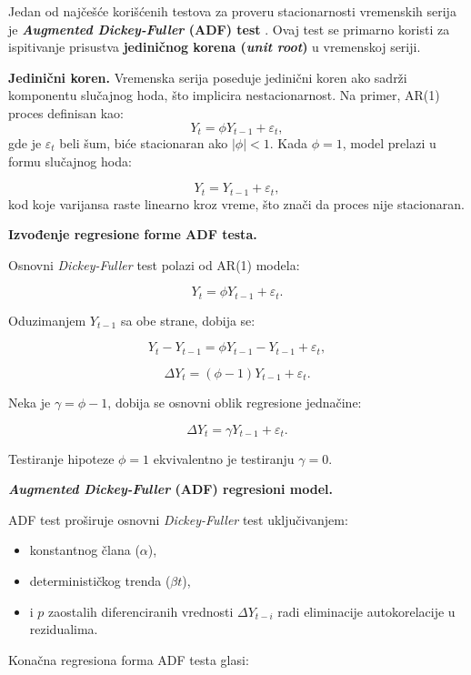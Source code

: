 \documentclass[12pt]{article}
\begin{document}
\noindent Jedan od najčešće korišćenih testova za proveru stacionarnosti vremenskih serija je \textbf{\textit{Augmented Dickey-Fuller} (ADF) test} \cite{dickey1979, box1970}. Ovaj test se primarno koristi za ispitivanje prisustva \textbf{jediničnog korena (\textit{unit root})} u vremenskoj seriji.

\bigskip

\noindent \textbf{Jedinični koren.} Vremenska serija poseduje jedinični koren ako sadrži komponentu slučajnog hoda, što implicira nestacionarnost. Na primer, AR(1) proces definisan kao:
\[
Y_t = \phi Y_{t-1} + \varepsilon_t,
\]
gde je $\varepsilon_t$ beli šum, biće stacionaran ako $|\phi| < 1$. Kada $\phi = 1$, model prelazi u formu slučajnog hoda:

\[
Y_t = Y_{t-1} + \varepsilon_t,
\]
kod koje varijansa raste linearno kroz vreme, što znači da proces nije stacionaran.


\noindent \textbf{Izvođenje regresione forme ADF testa.}

Osnovni \textit{Dickey-Fuller} test polazi od AR(1) modela:

\[
Y_t = \phi Y_{t-1} + \varepsilon_t.
\]

Oduzimanjem $Y_{t-1}$ sa obe strane, dobija se:

\[
Y_t - Y_{t-1} = \phi Y_{t-1} - Y_{t-1} + \varepsilon_t,
\]

\[
\Delta Y_t = (\phi - 1) Y_{t-1} + \varepsilon_t.
\]

Neka je $\gamma = \phi - 1$, dobija se osnovni oblik regresione jednačine:

\[
\Delta Y_t = \gamma Y_{t-1} + \varepsilon_t.
\]

\noindent Testiranje hipoteze $\phi = 1$ ekvivalentno je testiranju $\gamma = 0$.


\noindent \textbf{\textit{Augmented Dickey-Fuller} (ADF) regresioni model.}

ADF test proširuje osnovni \textit{Dickey-Fuller} test uključivanjem:

\begin{itemize}
    \item konstantnog člana ($\alpha$),
    \item determinističkog trenda ($\beta t$),
    \item i $p$ zaostalih diferenciranih vrednosti $\Delta Y_{t-i}$ radi eliminacije autokorelacije u rezidualima.
\end{itemize}

\noindent Konačna regresiona forma ADF testa glasi:
\end{document}
